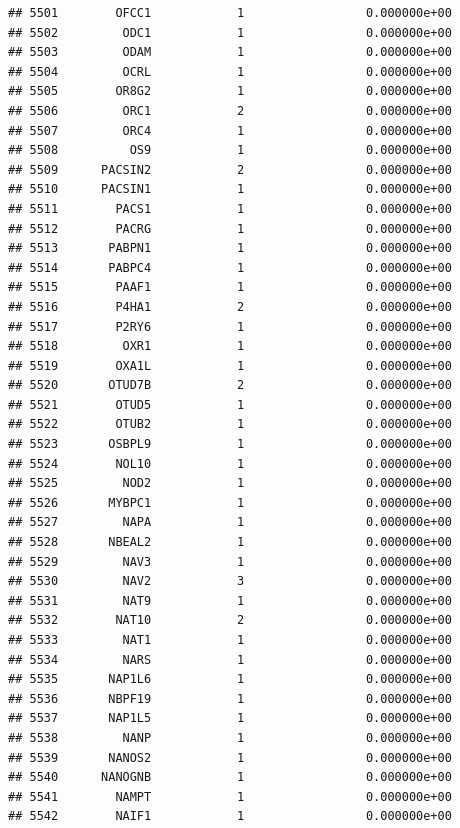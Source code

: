 \documentclass[
]{article}
\begin{document}
\begin{verbatim}
## 5501        OFCC1            1                 0.000000e+00
## 5502         ODC1            1                 0.000000e+00
## 5503         ODAM            1                 0.000000e+00
## 5504         OCRL            1                 0.000000e+00
## 5505        OR8G2            1                 0.000000e+00
## 5506         ORC1            2                 0.000000e+00
## 5507         ORC4            1                 0.000000e+00
## 5508          OS9            1                 0.000000e+00
## 5509      PACSIN2            2                 0.000000e+00
## 5510      PACSIN1            1                 0.000000e+00
## 5511        PACS1            1                 0.000000e+00
## 5512        PACRG            1                 0.000000e+00
## 5513       PABPN1            1                 0.000000e+00
## 5514       PABPC4            1                 0.000000e+00
## 5515        PAAF1            1                 0.000000e+00
## 5516        P4HA1            2                 0.000000e+00
## 5517        P2RY6            1                 0.000000e+00
## 5518         OXR1            1                 0.000000e+00
## 5519        OXA1L            1                 0.000000e+00
## 5520       OTUD7B            2                 0.000000e+00
## 5521        OTUD5            1                 0.000000e+00
## 5522        OTUB2            1                 0.000000e+00
## 5523       OSBPL9            1                 0.000000e+00
## 5524        NOL10            1                 0.000000e+00
## 5525         NOD2            1                 0.000000e+00
## 5526       MYBPC1            1                 0.000000e+00
## 5527         NAPA            1                 0.000000e+00
## 5528       NBEAL2            1                 0.000000e+00
## 5529         NAV3            1                 0.000000e+00
## 5530         NAV2            3                 0.000000e+00
## 5531         NAT9            1                 0.000000e+00
## 5532        NAT10            2                 0.000000e+00
## 5533         NAT1            1                 0.000000e+00
## 5534         NARS            1                 0.000000e+00
## 5535       NAP1L6            1                 0.000000e+00
## 5536       NBPF19            1                 0.000000e+00
## 5537       NAP1L5            1                 0.000000e+00
## 5538         NANP            1                 0.000000e+00
## 5539       NANOS2            1                 0.000000e+00
## 5540      NANOGNB            1                 0.000000e+00
## 5541        NAMPT            1                 0.000000e+00
## 5542        NAIF1            1                 0.000000e+00

\end{verbatim}
\end{document}
